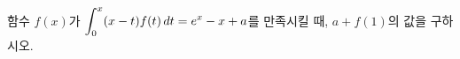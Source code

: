 \hspace*{2mm}\begin{minipage}[t]{\dimexpr\linewidth-2mm\relax}\vspace{0pt}
함수 $f(x)$가 $\displaystyle\int_{0}^{x}(x-t)f(t)\mkern3mu dt=e^x-x+a$를 만족시킬 때, $a+f(1)$의 값을 구하시오. \end{minipage}
